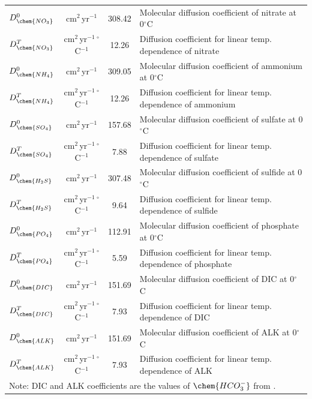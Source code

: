 \documentclass[gmd, manuscript]{copernicus}
\begin{document}
\begin{table}[hbtp]
\begin{tabular}{l c c l}
$D_{\chem{NO_3}}^0$ & cm$^2$\,yr$^{-1}$ & 308.42 &Molecular diffusion coefficient of nitrate at 0$^\circ$C\\
$D_{\chem{NO_3}}^T$ & cm$^2$\,yr$^{-1}$\,${}^{\circ}$C$^{-1}$ & 12.26 &Diffusion coefficient for linear temp. dependence of nitrate\\ %
$D_{\chem{NH_4}}^0$ & cm$^2$\,yr$^{-1}$ & 309.05 &Molecular diffusion coefficient of ammonium at 0$^\circ$C\\
$D_{\chem{NH_4}}^T$ & cm$^2$\,yr$^{-1}$\,${}^{\circ}$C$^{-1}$ & 12.26 &Diffusion coefficient for linear temp. dependence of ammonium\\ %
$D_{\chem{SO_4}}^0$ & cm$^2$\,yr$^{-1}$ & 157.68 &Molecular diffusion coefficient of sulfate at 0$^\circ$C\\
$D_{\chem{SO_4}}^T$ & cm$^2$\,yr$^{-1}$\,${}^{\circ}$C$^{-1}$ & 7.88 &Diffusion coefficient for linear temp. dependence of sulfate\\ %
$D_{\chem{H_2S}}^0$ & cm$^2$\,yr$^{-1}$ & 307.48 & Molecular diffusion coefficient of sulfide at 0$^\circ$C\\
$D_{\chem{H_2S}}^T$ & cm$^2$\,yr$^{-1}$\,${}^{\circ}$C$^{-1}$ & 9.64 & Diffusion coefficient for linear temp. dependence of sulfide\\ %
$D_{\chem{PO_4}}^0$ & cm$^2$\,yr$^{-1}$ & 112.91 &Molecular diffusion coefficient of phosphate at 0$^\circ$C\\
$D_{\chem{PO_4}}^T$ & cm$^2$\,yr$^{-1}$\,${}^{\circ}$C$^{-1}$ & 5.59 &Diffusion coefficient for linear temp. dependence of phosphate\\ %
$D_{\chem{DIC}}^0$ & cm$^2$\,yr$^{-1}$ & 151.69  &Molecular diffusion coefficient of DIC at 0$^\circ$C\\
$D_{\chem{DIC}}^T$ & cm$^2$\,yr$^{-1}$\,${}^{\circ}$C$^{-1}$ & 7.93  &Diffusion coefficient for linear temp. dependence of DIC\\ 
$D_{\chem{ALK}}^0$ & cm$^2$\,yr$^{-1}$ & 151.69  &Molecular diffusion coefficient of ALK at 0$^\circ$C\\
$D_{\chem{ALK}}^T$ & cm$^2$\,yr$^{-1}$\,${}^{\circ}$C$^{-1}$ & 7.93 &Diffusion coefficient for linear temp. dependence of ALK\\ 
\multicolumn{4}{l}{Note: DIC and ALK coefficients are the values of $\chem{HCO_3^{-}}$ from \citet{schulz_quantification_2006}.}\\
\hline\hline
\end{tabular}
\label{table:sed-charac_transport-parameters}
\end{table}
\end{document}
